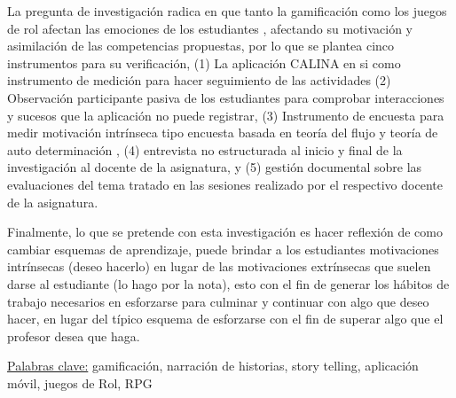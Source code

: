 \begin{singlespace}
La pregunta de investigación radica en que tanto la gamificación como los juegos de rol afectan las emociones 
de los estudiantes \cite{MULLINS2020304}, afectando su motivación y asimilación de las competencias 
propuestas, por lo que se plantea cinco instrumentos para su verificación, (1) La aplicación CALINA en si como 
instrumento de medición para hacer seguimiento de las actividades (2) Observación participante pasiva de los 
estudiantes para comprobar interacciones y sucesos que la aplicación no puede registrar, (3) Instrumento de 
encuesta para medir motivación intrínseca tipo encuesta basada en teoría del flujo y teoría de auto 
determinación \cite{KRATH2021106963, csikszentmihalyi_1988, deci1985intrinsic}, (4) entrevista no estructurada
al inicio y final de la investigación al docente de la asignatura, y (5) gestión documental sobre las 
evaluaciones del tema tratado en las sesiones realizado por el respectivo docente de la asignatura. 

Finalmente, lo que se pretende con esta investigación es hacer reflexión de como cambiar esquemas de 
aprendizaje, puede brindar a los estudiantes motivaciones intrínsecas (deseo hacerlo) en lugar de las 
motivaciones extrínsecas que suelen darse al estudiante (lo hago por la nota), esto con el fin de generar los 
hábitos de trabajo necesarios en esforzarse para culminar y continuar con algo que deseo hacer, en lugar del 
típico esquema de esforzarse con el fin de superar algo que el profesor desea que haga.
\end{singlespace}

\uline{Palabras clave:} gamificación, narración de historias, story telling, aplicación móvil, juegos de Rol, RPG





